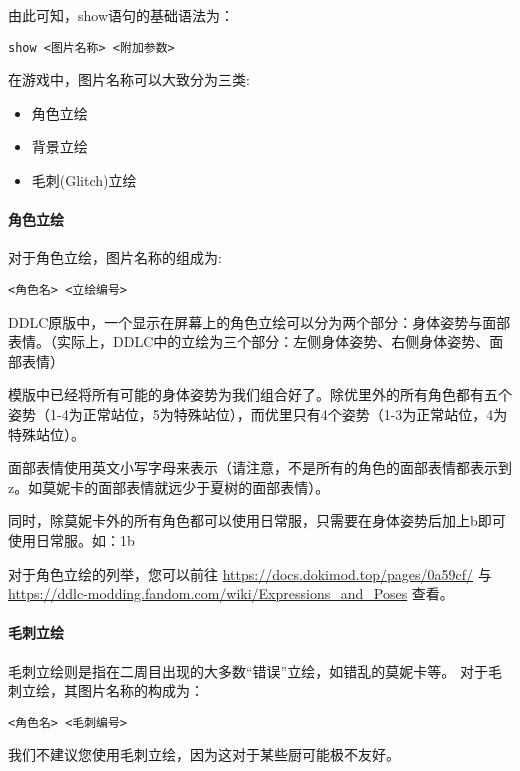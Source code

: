 由此可知，show语句的基础语法为：
\begin{lstlisting}[numbers=none]
show <图片名称> <附加参数>
\end{lstlisting}

在游戏中，图片名称可以大致分为三类:
\begin{itemize}
    \item 角色立绘
    \item 背景立绘
    \item 毛刺(Glitch)立绘
\end{itemize}

\paragraph{角色立绘}\label{para:3.2.2.1}

对于角色立绘，图片名称的组成为:
\begin{lstlisting}[numbers=none]
<角色名> <立绘编号>
\end{lstlisting}

DDLC原版中，一个显示在屏幕上的角色立绘可以分为两个部分：身体姿势与面部表情。（实际上，DDLC中的立绘为三个部分：左侧身体姿势、右侧身体姿势、面部表情）

模版中已经将所有可能的身体姿势为我们组合好了。除优里外的所有角色都有五个姿势（1-4为正常站位，5为特殊站位），而优里只有4个姿势（1-3为正常站位，4为特殊站位）。

面部表情使用英文小写字母来表示（请注意，不是所有的角色的面部表情都表示到z。如莫妮卡的面部表情就远少于夏树的面部表情）。

同时，除莫妮卡外的所有角色都可以使用日常服，只需要在身体姿势后加上b即可使用日常服。如：1b

对于角色立绘的列举，您可以前往 \url{https://docs.dokimod.top/pages/0a59cf/} 与 \url{https://ddlc-modding.fandom.com/wiki/Expressions_and_Poses} 查看。


\paragraph{毛刺立绘}

毛刺立绘则是指在二周目出现的大多数“错误”立绘，如错乱的莫妮卡等。
对于毛刺立绘，其图片名称的构成为：
\begin{lstlisting}[numbers=none]
<角色名> <毛刺编号>
\end{lstlisting}

\begin{Warning}
    我们不建议您使用毛刺立绘，因为这对于某些厨可能极不友好。
\end{Warning}

